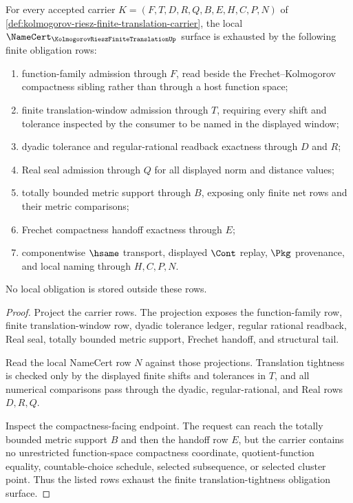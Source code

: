 \begin{theorem}
\label{thm:kolmogorov-riesz-finite-translation-namecert-obligations}
For every accepted carrier $K=(F,T,D,R,Q,B,E,H,C,P,N)$ of \autoref{def:kolmogorov-riesz-finite-translation-carrier}, the local $\NameCert_{\KolmogorovRieszFiniteTranslationUp}$ surface is exhausted by the following finite obligation rows:
\begin{enumerate}
\item function-family admission through $F$, read beside the Frechet--Kolmogorov compactness sibling rather than through a host function space;
\item finite translation-window admission through $T$, requiring every shift and tolerance inspected by the consumer to be named in the displayed window;
\item dyadic tolerance and regular-rational readback exactness through $D$ and $R$;
\item Real seal admission through $Q$ for all displayed norm and distance values;
\item totally bounded metric support through $B$, exposing only finite net rows and their metric comparisons;
\item Frechet compactness handoff exactness through $E$;
\item componentwise $\hsame$ transport, displayed $\Cont$ replay, $\Pkg$ provenance, and local naming through $H,C,P,N$.
\end{enumerate}
No local obligation is stored outside these rows.
\end{theorem}
\begin{proof}
Project the carrier rows. The projection exposes the function-family row, finite translation-window row, dyadic tolerance ledger, regular rational readback, Real seal, totally bounded metric support, Frechet handoff, and structural tail.

Read the local NameCert row $N$ against those projections. Translation tightness is checked only by the displayed finite shifts and tolerances in $T$, and all numerical comparisons pass through the dyadic, regular-rational, and Real rows $D,R,Q$.

Inspect the compactness-facing endpoint. The request can reach the totally bounded metric support $B$ and then the handoff row $E$, but the carrier contains no unrestricted function-space compactness coordinate, quotient-function equality, countable-choice schedule, selected subsequence, or selected cluster point. Thus the listed rows exhaust the finite translation-tightness obligation surface.
\end{proof}

